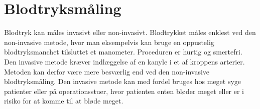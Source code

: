 \section{Blodtryksmåling}
\vspace{0.1 cm}
Blodtryk kan måles invasivt eller non-invasivt. Blodtrykket måles enklest ved den non-invasive metode, hvor man eksempelvis kan bruge en oppustelig blodtryksmanchet tilsluttet et manometer. Proceduren er hurtig og smertefri.
Den invasive metode kræver indlæggelse af en kanyle i et af kroppens arterier. Metoden kan derfor være mere besværlig end ved den non-invasive blodtryksmåling. Den invasive metode kan med fordel bruges hos meget syge patienter eller på operationsstuer, hvor patienten enten bløder meget eller er i risiko for at komme til at bløde meget.  
